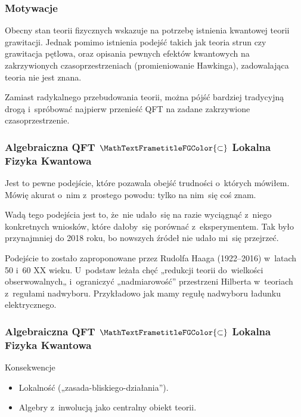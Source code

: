 \documentclass[10pt,t]{beamer}
\begin{document}
\begin{frame}
  \frametitle{Motywacje}


  Obecny stan teorii fizycznych wskazuje na potrzebę istnienia
  kwantowej teorii grawitacji. Jednak pomimo istnienia podejść
  takich jak teoria strun czy grawitacja pętlowa, oraz opisania
  pewnych efektów kwantowych na zakrzywionych czasoprzestrzeniach
  (promieniowanie Hawkinga), zadowalająca teoria nie jest znana.

  Zamiast radykalnego przebudowania teorii, można pójść bardziej
  tradycyjną drogą i~spróbować najpierw przenieść QFT na zadane
  zakrzywione czasoprzestrzenie.

\end{frame}





\begin{frame}
  \frametitle{Algebraiczna QFT $\MathTextFrametitleFGColor{\subset}$
    Lokalna Fizyka Kwantowa}


  Jest to pewne podejście, które pozawala obejść trudności o~których
  mówiłem. Mówię akurat o~nim z~prostego powodu: tylko na nim~się coś
  znam.

  Wadą tego podejścia jest to, że~nie udało~się na razie wyciągnąć
  z~niego konkretnych wniosków, które dałoby~się porównać
  z~eksperymentem. Tak było przynajmniej do 2018 roku, bo nowszych
  źródeł nie udało mi~się przejrzeć.


  Podejście to zostało zaproponowane przez Rudolfa Haaga (1922--2016)
  w~latach 50 i~60 XX wieku. U~podstaw leżała chęć „redukcji teorii
  do~wielkości obserwowalnych„ i~ograniczyć „nadmiarowość”
  przestrzeni Hilberta w~teoriach z~regułami nadwyboru. Przykładowo
  jak mamy regułę nadwyboru ładunku elektrycznego.

\end{frame}





\begin{frame}
  \frametitle{Algebraiczna QFT $\MathTextFrametitleFGColor{\subset}$
    Lokalna Fizyka Kwantowa}


  Konsekwencje
  \begin{itemize}
    \RaggedRight

  \item Lokalność („zasada-bliskiego-działania”).

  \item Algebry z~inwolucją jako centralny obiekt teorii.

  \end{itemize}

\end{frame}
\end{document}
